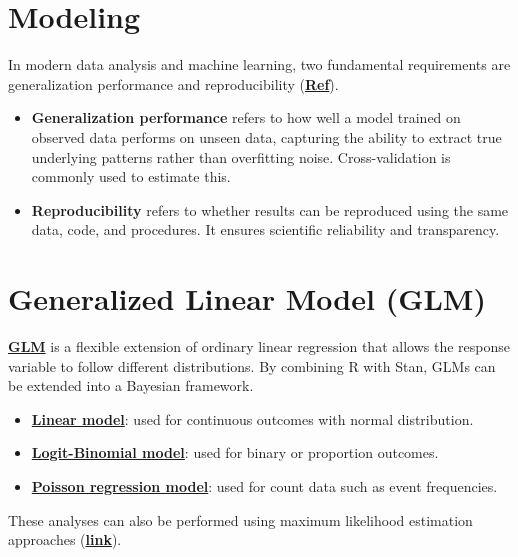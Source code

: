 \documentclass[11pt]{article}
\begin{document}
\section{Modeling}
In modern data analysis and machine learning, 
two fundamental requirements are generalization performance and 
reproducibility (\href{https://tjo.hatenablog.com/entry/2026/03/27/170000}{\textbf{Ref}}).
\begin{itemize}
\item \textbf{Generalization performance} refers to how well a model trained on observed data performs on unseen data, capturing the ability to extract true underlying patterns rather than overfitting noise. Cross-validation is commonly used to estimate this.
\item \textbf{Reproducibility} refers to whether results can be reproduced using the same data, code, and procedures. It ensures scientific reliability and transparency.
\end{itemize}

\section{Generalized Linear Model (GLM)}
\href{https://en.wikipedia.org/wiki/Generalized_linear_model}{\textbf{GLM}} is a flexible extension of ordinary linear regression 
that allows the response variable to follow different distributions. 
By combining R with Stan, GLMs can be extended into a Bayesian framework.
\begin{itemize}
\item \href{https://github.com/Hiroki-Ando1998/R/blob/main/Generalized%20linear%20model/Baysian_approach/1_LinearModel.stan}{\textbf{Linear model}}: used for continuous outcomes with normal distribution.
\item \href{https://github.com/Hiroki-Ando1998/R/blob/main/Generalized%20linear%20model/Baysian_approach/2_LogisticModel.stan}{\textbf{Logit-Binomial model}}: used for binary or proportion outcomes.
\item \href{https://github.com/Hiroki-Ando1998/R/blob/main/Generalized%20linear%20model/Baysian_approach/3_PoissonModel}{\textbf{Poisson regression model}}: used for count data such as event frequencies.
\end{itemize}
These analyses can also be performed using maximum likelihood estimation approaches 
(\href{https://github.com/Hiroki-Ando1998/R/tree/main/Generalized%20linear%20model}{\textbf{link}}).
\end{document}
